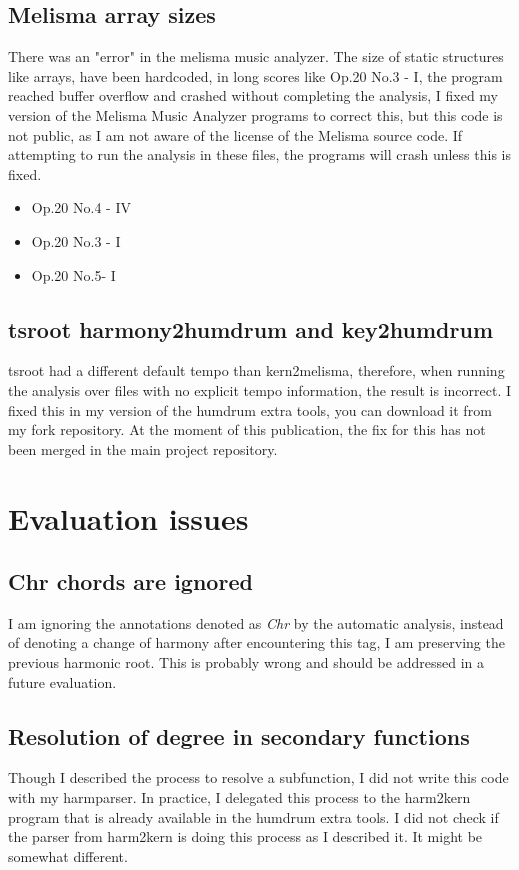 		\subsection{Melisma array sizes}
    There was an "error" in the melisma music analyzer. The size of static structures like arrays, have been hardcoded, in long scores like Op.20 No.3 - I, the program reached buffer overflow and crashed without completing the analysis, I fixed my version of the Melisma Music Analyzer programs to correct this, but this code is not public, as I am not aware of the license of the Melisma source code. If attempting to run the analysis in these files, the programs will crash unless this is fixed.
    \begin{itemize}
    \item Op.20 No.4 - IV
    \item Op.20 No.3 - I
    \item Op.20 No.5- I
    \end{itemize}
		\subsection{tsroot harmony2humdrum and key2humdrum}
    tsroot had a different default tempo than kern2melisma, therefore, when running the analysis over files with no explicit tempo information, the result is incorrect. I fixed this in my version of the humdrum extra tools, you can download it from my fork repository. At the moment of this publication, the fix for this has not been merged in the main project repository.
	\section{Evaluation issues}
		\subsection{Chr chords are ignored}
    I am ignoring the annotations denoted as \emph{Chr} by the automatic analysis, instead of denoting a change of harmony after encountering this tag, I am preserving the previous harmonic root. This is probably wrong and should be addressed in a future evaluation.
		\subsection{Resolution of degree in secondary functions}
    Though I described the process to resolve a subfunction, I did not write this code with my harmparser. In practice, I delegated this process to the harm2kern program that is already available in the humdrum extra tools. I did not check if the parser from harm2kern is doing this process as I described it. It might be somewhat different.
